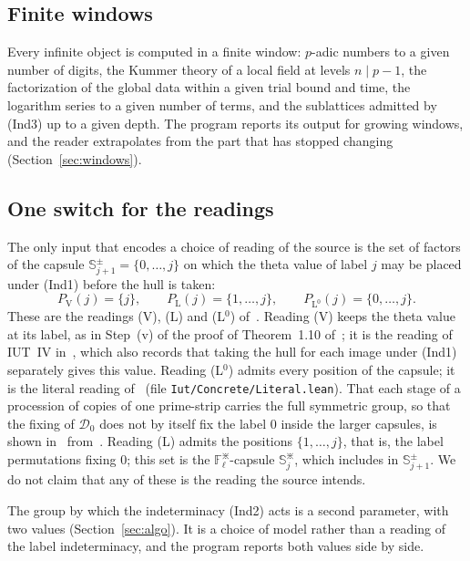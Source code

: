 \documentclass[11pt,a4paper]{article}
\newcommand{\F}{\mathbb{F}}
\begin{document}
\subsection{Finite windows}
Every infinite object is computed in a finite window: $p$-adic numbers to a given number of digits, the Kummer
theory of a local field at levels $n\mid p-1$, the factorization of the global data within a given trial bound
and time, the logarithm series to a given number of terms, and the sublattices admitted by (Ind3) up to a given
depth. The program reports its output for growing windows, and the reader extrapolates from the part that has
stopped changing (Section~\ref{sec:windows}).

\subsection{One switch for the readings}\label{sec:readings}
The only input that encodes a choice of reading of the source is the set of factors of the capsule
$\mathbb{S}^\pm_{j+1}=\{0,\dots,j\}$ on which the theta value of label $j$ may be placed under (Ind1) before the
hull is taken:
\[
P_{\mathrm V}(j)=\{j\},\qquad P_{\mathrm L}(j)=\{1,\dots,j\},\qquad P_{\mathrm L^0}(j)=\{0,\dots,j\}.
\]
These are the readings (V), (L) and (L$^0$) of~\cite{Cat}. Reading (V) keeps the theta value at its label, as in
Step~(v) of the proof of Theorem~1.10 of~\cite{IUT4}; it is the reading of IUT~IV in~\cite{LANAiut}, which also
records that taking the hull for each image under (Ind1) separately gives this value. Reading (L$^0$) admits
every position of the capsule; it is the literal reading of~\cite{LANAiut} (file
\nolinkurl{Iut/Concrete/Literal.lean}). That each stage of a procession of copies of one prime-strip carries the full
symmetric group, so that the fixing of $\mathcal{D}_0$ does not by itself fix the label $0$ inside the larger capsules,
is shown in~\cite[\S6]{Fourth} from~\cite[\S0, Def.~4.10, Prop.~6.9(i)]{IUT1}. Reading (L) admits the positions
$\{1,\dots,j\}$, that is, the label permutations fixing $0$; this set is the $\F_\ell^{\divideontimes}$-capsule
$\mathbb{S}^{\divideontimes}_j$, which
\cite[Prop.~6.9(iii)]{IUT1} includes in $\mathbb{S}^\pm_{j+1}$. We do not claim that any of these is the
reading the source intends.

The group by which the indeterminacy (Ind2) acts is a second parameter, with two values
(Section~\ref{sec:algo}). It is a choice of model rather than a reading of the label indeterminacy, and the program
reports both values side by side.
\end{document}
